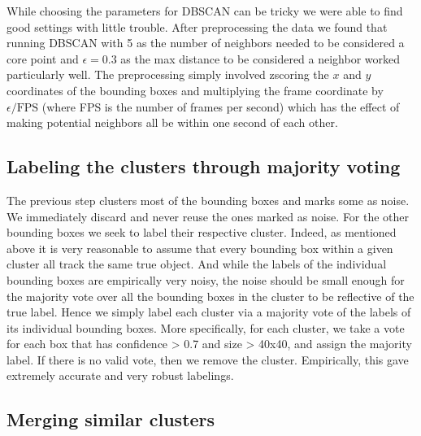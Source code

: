 \documentclass{article}
\begin{document}
While choosing the parameters for DBSCAN can be tricky we were able to find good settings with little trouble.
After preprocessing the data we found that running DBSCAN with 5 as the number of neighbors needed to be considered a core point and $\epsilon=0.3$ as
the max distance to be considered a neighbor worked particularly well. The preprocessing simply involved zscoring the $x$ and $y$ coordinates of the bounding boxes
and multiplying the frame coordinate by $\epsilon / \text{FPS}$ (where FPS is the number of frames per second) which has the effect of making potential neighbors all be within one
second of each other.

\subsection{Labeling the clusters through majority voting}

The previous step clusters most of the bounding boxes and marks some as noise. We immediately discard and never reuse the ones marked as noise. For the other bounding boxes we seek to label their respective
cluster. Indeed, as mentioned above it is very reasonable to assume that every bounding box within a given cluster all track the same true object. And while the labels of the individual bounding boxes
are empirically very noisy, the noise should be small enough for the majority vote over all the bounding boxes in the cluster to be reflective of the true label. Hence we simply label each cluster
via a majority vote of the labels of its individual bounding boxes. More specifically, for each cluster, we take a vote for each box that has confidence > 0.7 and size > 40x40, and assign the majority label. If there is no valid vote, then we remove the cluster.
Empirically, this gave extremely accurate and very robust labelings.

\subsection{Merging similar clusters}
\end{document}
